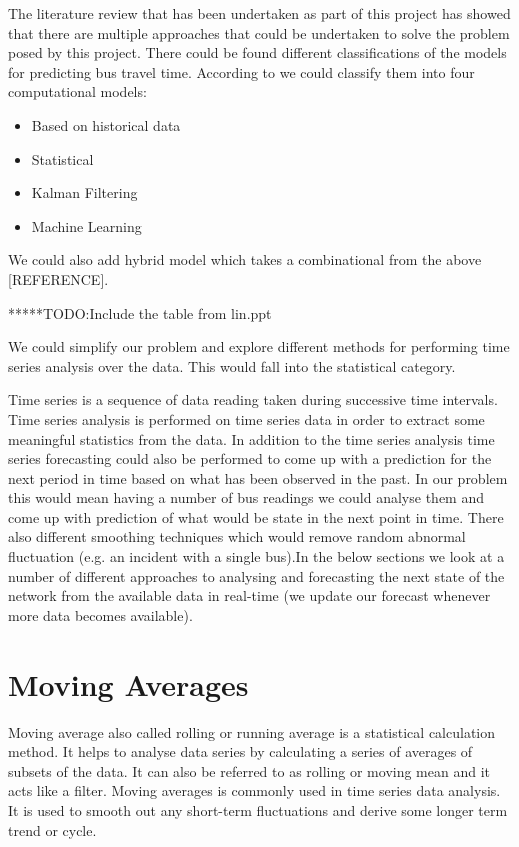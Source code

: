 The literature review that has been undertaken as part of this project has showed that there are multiple approaches that could be undertaken to solve the problem posed by this project. There could be found different classifications of the models for predicting bus travel time\cite{surveyAIApplications}. According to \cite{urbanBusArrivalTimeCompModels} we could classify them into four computational models:
\begin{itemize}
	\item Based on historical data
	\item Statistical 
	\item Kalman Filtering 
	\item Machine Learning
\end{itemize}
We could also add hybrid model which takes a combinational from the above [REFERENCE].

*****TODO:Include the table from lin.ppt

We could simplify our problem and explore different methods for performing time series analysis over the data. This would fall into the statistical category.

Time series is a sequence of data reading taken during successive time intervals. Time series analysis is performed on time series data in order to extract some meaningful statistics from the data. In addition to the time series analysis time series forecasting could also be performed to come up with a prediction for the next period in time based on what has been observed in the past. In our problem this would mean having a number of bus readings we could analyse them and come up with prediction of what would be state in the next point in time. There also different smoothing techniques which would remove random abnormal fluctuation (e.g. an incident with a single bus).In the below sections we look at a number of different approaches to analysing and forecasting the next state of the network from the available data in real-time (we update our forecast whenever more data becomes available).

\section{Moving Averages}
Moving average also called rolling or running average is a statistical calculation method. It helps to analyse data series by calculating a series of averages of subsets of the data. It can also be referred to as rolling or moving mean and it acts like a filter. Moving averages is commonly used in time series data analysis. It is used to smooth out any short-term fluctuations and derive some longer term trend or cycle.
